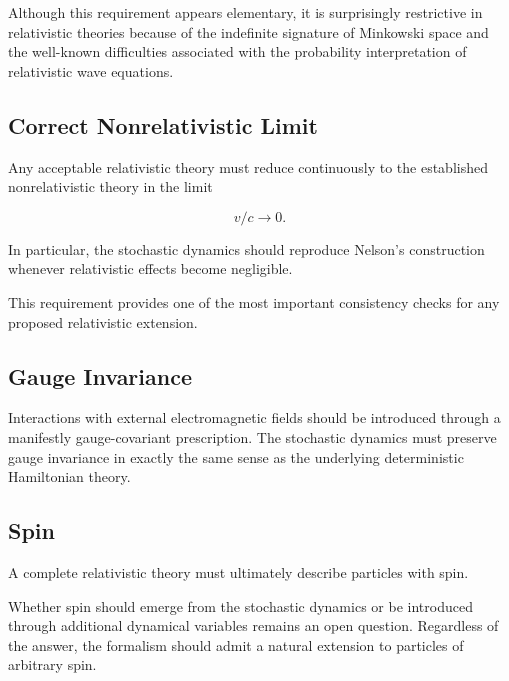 Although this requirement appears elementary, it is surprisingly
restrictive in relativistic theories because of the indefinite signature
of Minkowski space and the well-known difficulties associated with the
probability interpretation of relativistic wave equations.

\subsection{Correct Nonrelativistic Limit}

Any acceptable relativistic theory must reduce continuously to the
established nonrelativistic theory in the limit

\[
v/c \rightarrow 0.
\]

In particular, the stochastic dynamics should reproduce Nelson's
construction whenever relativistic effects become negligible.

This requirement provides one of the most important consistency checks
for any proposed relativistic extension.

\subsection{Gauge Invariance}

Interactions with external electromagnetic fields should be introduced
through a manifestly gauge-covariant prescription. The stochastic
dynamics must preserve gauge invariance in exactly the same sense as the
underlying deterministic Hamiltonian theory.

\subsection{Spin}

A complete relativistic theory must ultimately describe particles with
spin.

Whether spin should emerge from the stochastic dynamics or be introduced
through additional dynamical variables remains an open question.
Regardless of the answer, the formalism should admit a natural extension
to particles of arbitrary spin.

